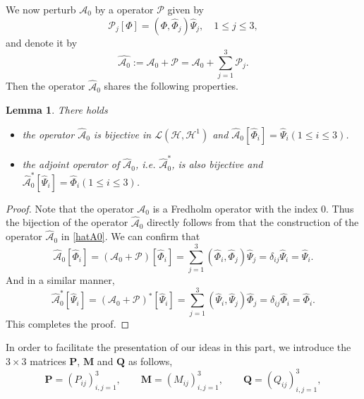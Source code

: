\documentclass[10pt,reqno,oneside]{amsart}%
\newtheorem{lem}{Lemma}[section]
\theoremstyle{definition}
\theoremstyle{remark}
\numberwithin{equation}{section}
\numberwithin{equation}{section}
\begin{document}
We now perturb $\mathcal{A}_0$ by a operator $\mathcal{P}$ given by
$$
\mathcal{P}_{j}[\Phi]=(\Phi,\hat{\Phi}_{j})\hat{\Psi}_{j},\quad 1 \leq j \leq 3,
$$
and denote it by
\begin{equation}\label{hatA0}
\hat{\mathcal{A}_0}:=\mathcal{A}_0+\mathcal{P}=\mathcal{A}_{0}+\sum_{j=1}^{3} \mathcal{P}_{j}.
\end{equation}
Then the operator $\hat{\mathcal{A}}_{0}$ shares the following properties.
\begin{lem}
There holds
\begin{itemize}
\item[(i)] the operator $\hat{\mathcal{A}}_{0}$ is {bijective} in $\mathcal{L}\left(\mathcal{H}, \mathcal{H}^{1}\right)$ and $\hat{\mathcal{A}}_{0}[\hat{\Phi}_{i}]=\hat{\Psi}_{i}(1 \leq i \leq 3)$.
\item[(ii)]the adjoint operator of $\hat{\mathcal{A}}_{0}$, i.e. $\hat{\mathcal{A}}_{0}^{*}$, is also {bijective} and $\hat{\mathcal{A}}_{0}^{*}[\hat{\Psi}_{i}]=\hat{\Phi}_{i}(1 \leq i \leq 3)$.
\end{itemize}
\end{lem}
\begin{proof}
Note that the operator ${\mathcal{A}}_{0}$ is a Fredholm operator with the index 0. Thus the {bijection} of the operator $\hat{\mathcal{A}}_{0}$ directly follows from that the construction of the operator
$\hat{\mathcal{A}}_{0}$ in \eqref{hatA0}. We can confirm that
\begin{equation}
\hat{\mathcal{A}}_{0}[\hat{\Phi}_{i}]=(\mathcal{A}_0+\mathcal{P})[\hat{\Phi}_{i}]=\sum_{j=1}^{3}(\hat{\Phi}_{i},\hat{\Phi}_{j})\hat{\Psi}_{j}
={\delta_{ij}}\hat{\Psi}_{i}=\hat{\Psi}_{i}.\nonumber
\end{equation}
And in a similar manner,
\begin{equation}
\hat{\mathcal{A}}_{0}^{*}[\hat{\Psi}_{i}]=(\mathcal{A}_0+\mathcal{P})^{*}[\hat{\Psi}_{i}]=\sum_{j=1}^{3}(\hat{\Psi}_{i},\hat{\Psi}_{j})\hat{\Phi}_{j}
={\delta_{ij}}\hat{\Phi}_{i}=\hat{\Phi}_{i}.\nonumber
\end{equation}
This completes the proof.
\end{proof}
In order to facilitate the presentation of our ideas in this part, we introduce the $3\times3$ matrices $\mathbf{P}$, $\mathbf{M}$ and $\mathbf{Q}$ as follows,
\begin{equation}
\mathbf{P}=(P_{ij})_{i,j=1}^{3},\quad\quad \mathbf{M}=(M_{ij})_{i,j=1}^{3},\quad\quad \mathbf{Q}=(Q_{ij})_{i,j=1}^{3}, \nonumber
\end{equation}
\end{document}
